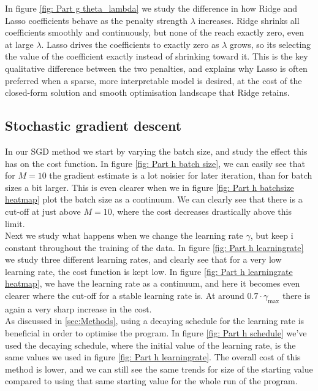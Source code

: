 \documentclass[reprint,english,notitlepage]{revtex4-2}  %
\begin{document}
In figure \ref{fig: Part g theta_lambda} we study the difference in how Ridge and Lasso coefficients behave as the penalty strength $\lambda$ increases. Ridge shrinks all coefficients smoothly and continuously, but none of the reach exactly zero, even at large $\lambda$. Lasso drives the coefficients to exactly zero as $\lambda$ grows, so its selecting the value of the coefficient exactly instead of shrinking toward it. This is the key qualitative difference between the two penalties, and explains why Lasso is often preferred when a sparse, more interpretable model is desired, at the cost of the closed-form solution and smooth optimisation landscape that Ridge retains.

\subsection{Stochastic gradient descent} %
In our SGD method we start by varying the batch size, and study the effect this has on the cost function. In figure \ref{fig: Part h batch size}, we can easily see that for $M = 10$ the gradient estimate is a lot noisier for later iteration, than for batch sizes a bit larger. This is even clearer when we in figure \ref{fig: Part h batchsize heatmap} plot the batch size as a continuum. We can clearly see that there is a cut-off at just above $M = 10$, where the cost decreases drastically above this limit. \\
Next we study what happens when we change the learning rate $\gamma$, but keep i constant throughout the training of the data. In figure \ref{fig: Part h learningrate} we study three different learning rates, and clearly see that for a very low learning rate, the cost function is kept low. In figure \ref{fig: Part h learningrate heatmap}, we have the learning rate as a continuum, and here it becomes even clearer where the cut-off for a stable learning rate is. At around $0.7 \cdot \gamma_{\text{max}}$ there is again a very sharp increase in the cost. \\
As discussed in \ref{sec:Methods}, using a decaying schedule for the learning rate is beneficial in order to optimise the program. In figure \ref{fig: Part h schedule} we've used the decaying schedule, where the initial value of the learning rate, is the same values we used in figure \ref{fig: Part h learningrate}. The overall cost of this method is lower, and we can still see the same trends for size of the starting value compared to using that same starting value for the whole run of the program. \\
\end{document}
